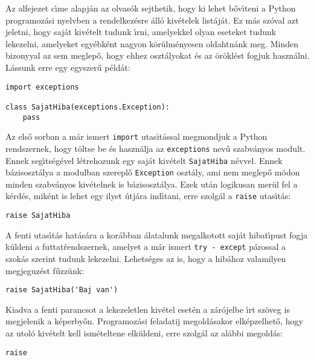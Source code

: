 Az alfejezet c\'{\i}me alapj\'an az olvas\'ok sejthetik, hogy ki lehet b\H{o}v\'{\i}teni a Python programoz\'asi nyelvben 
a rendelkez\'esre \'all\'o kiv\'etelek list\'aj\'at. Ez m\'as sz\'oval azt jeletni, hogy saj\'at kiv\'etelt tudunk \'{\i}rni, 
amelyekkel olyan eseteket tudunk lekezelni, amelyeket egy\'ebk\'ent nagyon k\"or\"ulm\'enyesen oldahtn\'ank meg. Minden 
bizonyyal az sem meglep\H{o}, hogy ehhez oszt\'alyokat \'es az \"or\"okl\'est fogjuk haszn\'alni. L\'assunk erre egy 
egyszer\H{u} p\'eld\'at:

\begin{Verbatim}[fontsize=\small]
import exceptions

class SajatHiba(exceptions.Exception):
    pass

\end{Verbatim}

Az els\H{o} sorban a m\'ar ismert {\tt import} utas\'{\i}t\'assal megmondjuk a Python rendszernek, hogy t\"oltse be \'es 
haszn\'alja az {\tt exceptions} nev\H{u} szabv\'anyos modult. Ennek seg\'{\i}ts\'eg\'evel l\'etrehozunk egy saj\'at 
kiv\'etelt {\tt SajatHiba} n\'evvel. Ennek b\'azisoszt\'alya a modulban szerepl\H{o} {\tt Exception} oszt\'aly, ami nem 
meglep\H{o} m\'odon minden szabv\'anyos kiv\'etelnek is b\'azisoszt\'alya. Ezek ut\'an logikusan mer\"ul fel a k\'erd\'es, 
mik\'ent is lehet egy ilyet \'utj\'ara ind\'{\i}tani, erre szolg\'al a {\tt raise} utas\'{\i}t\'as:

\begin{Verbatim}[fontsize=\small]
raise SajatHiba
\end{Verbatim}

A fenti utas\'{\i}t\'as hat\'as\'ara a kor\'abban \'alatalunk megalkotott saj\'at hibat\'{\i}pust fogja k\"uldeni a 
futtat\'rendszernek, amelyet a m\'ar ismert {\tt try - except} p\'arossal a szok\'as szerint tudunk lekezelni. Lehets\'eges 
az is, hogy a hib\'ahoz valamilyen megjeguz\'est f\H{u}zz\"unk:

\begin{Verbatim}[fontsize=\small]
raise SajatHiba('Baj van')
\end{Verbatim}

Kiadva a fenti parancsot a lekezeletlen kiv\'etel eset\'en a z\'ar\'ojelbe \'{\i}rt sz\"oveg is megjelenik a k\'eperby\H{o}n.
Programoz\'asi feladatij megold\'asakor elk\'epzelhet\H{o}, hogy az utol\'o kiv\'etelt kell ism\'eteltene elk\"uldeni, erre 
szolg\'al az al\'abbi megold\'as:

\begin{Verbatim}[fontsize=\small]
raise
\end{Verbatim}

